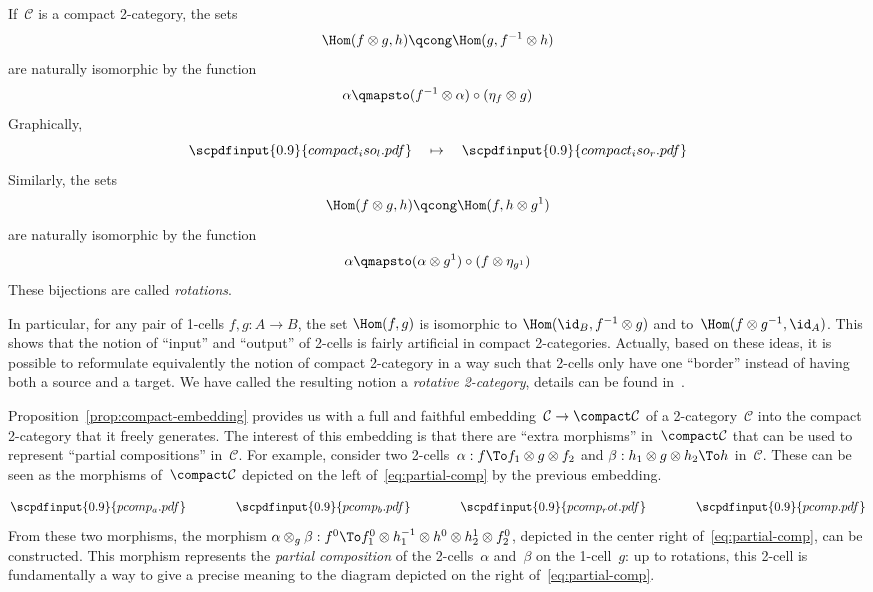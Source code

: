 \documentclass{LMCS}
\newcommand{\strid}[1]{\scpdfinput{0.9}{#1.pdf}}
\newenvironment{proposition}{\begin{prop}}{\end{prop}}
\renewcommand{\C}{\mathcal{C}}
\begin{document}
\begin{proposition}
  \label{prop:compact-iso}
  If~$\C$ is a compact 2-category, the sets
  \[
  \Hom(f\otimes g,h)
  \qcong
  \Hom(g,f^{-1}\otimes h)
  \]
  are naturally isomorphic by the function
  \[
  \alpha
  \qmapsto
  (f^{-1}\otimes\alpha)\circ(\eta_{f}\otimes g)
  \]
  Graphically,
  \[
  \strid{compact_iso_l}
  \quad\mapsto\quad
  \strid{compact_iso_r}
  \]
  Similarly, the sets
  \[
  \Hom(f\otimes g,h)
  \qcong
  \Hom(f,h\otimes g^1)
  \]
  are naturally isomorphic by the function
  \[
  \alpha
  \qmapsto
  (\alpha\otimes g^1)\circ(f\otimes\eta_{g^1})
  \]
  These bijections are called \emph{rotations}.
\end{proposition}
In particular, for any pair of 1-cells $f,g:A\to B$, the set $\Hom(f,g)$ is
isomorphic to $\Hom(\id_B,f^{-1}\otimes g)$ and to~$\Hom(f\otimes
g^{-1},\id_A)$. This shows that the notion of ``input'' and ``output'' of
2-cells is fairly artificial in compact 2-categories. Actually, based on these
ideas, it is possible to reformulate equivalently the notion of compact
2-category in a way such that 2-cells only have one ``border'' instead of having
both a source and a target. We have called the resulting notion a \emph{rotative
  2-category}, details can be found in~\cite{mimram:2-cp}.



















\bigskip
Proposition~\ref{prop:compact-embedding} provides us with a full and faithful
embedding~$\C\to\compact\C$ of a 2-category~$\C$ into the compact 2-category
that it freely generates.  The interest of this embedding is that there are
``extra morphisms'' in~$\compact\C$ that can be used to represent ``partial
compositions'' in~$\C$. For example, consider two 2-cells~$\alpha:f\To
f_1\otimes g\otimes f_2$ and $\beta:h_1\otimes g\otimes h_2\To h$ in~$\C$. These
can be seen as the morphisms of~$\compact\C$ depicted on the left
of~\eqref{eq:partial-comp} by the previous embedding.

\begin{equation}
  \label{eq:partial-comp}
  \strid{pcomp_a}
  \qquad\qquad
  \strid{pcomp_b}
  \qquad\qquad
  \strid{pcomp_rot}
  \qquad\qquad
  \strid{pcomp}
\end{equation}
From these two morphisms, the morphism \hbox{$\alpha\otimes_g\beta:f^0\To
  f_1^0\otimes h_1^{-1}\otimes h^0\otimes h_2^1\otimes f_2^0$}, depicted in the
center right of~\eqref{eq:partial-comp}, can be constructed. This morphism
represents the \emph{partial composition} of the 2-cells~$\alpha$ and~$\beta$ on
the 1-cell~$g$: up to rotations, this 2-cell is fundamentally a way to give a
precise meaning to the diagram depicted on the right of~\eqref{eq:partial-comp}.
\end{document}
